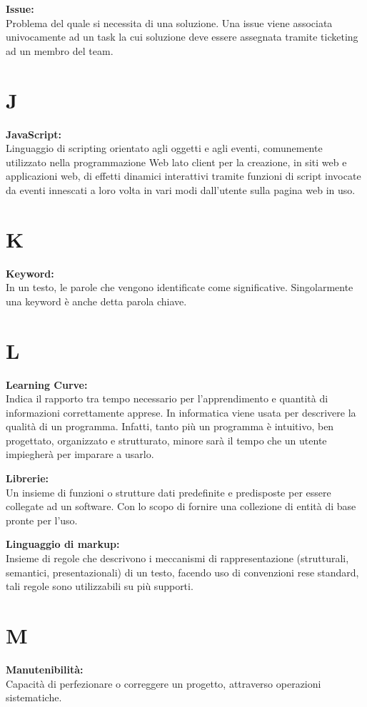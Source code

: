 \documentclass[a4paper, oneside, openany, dvipsnames, table]{article}
\begin{document}
\textbf{Issue:}\\ Problema del quale si necessita di una soluzione. Una issue viene associata univocamente ad un task la cui soluzione deve essere assegnata tramite ticketing ad un membro del team.

\newpage
\section{J}
\textbf{JavaScript:}\\	Linguaggio di scripting orientato agli oggetti e agli eventi, comunemente utilizzato nella programmazione Web lato client per la creazione, in siti web e applicazioni web, di effetti dinamici interattivi tramite funzioni di script invocate da eventi innescati a loro volta in vari modi dall'utente sulla pagina web in uso.

\newpage
\section{K}
\textbf{Keyword:}\\	In un testo, le parole che vengono identificate come significative. Singolarmente una keyword è anche detta parola chiave.

\newpage
\section{L}
\textbf{Learning Curve:}\\	Indica il rapporto tra tempo necessario per l'apprendimento e quantità di informazioni correttamente apprese. In informatica viene usata per descrivere la qualità di un programma. Infatti, tanto più un programma è intuitivo, ben progettato, organizzato e strutturato, minore sarà il tempo che un utente impiegherà per imparare a usarlo. 

\textbf{Librerie:}\\	Un insieme di funzioni o strutture dati predefinite e predisposte per essere collegate ad un software. Con lo scopo di fornire una collezione di entità di base pronte per l'uso.

\textbf{Linguaggio di markup:}\\  Insieme di regole che descrivono i meccanismi di rappresentazione (strutturali, semantici, presentazionali) di un testo, facendo uso di convenzioni rese standard, tali regole sono utilizzabili su più supporti.

\newpage
\section{M}
\textbf{Manutenibilità:}\\ Capacità di perfezionare o correggere un progetto, attraverso operazioni sistematiche.
\end{document}
